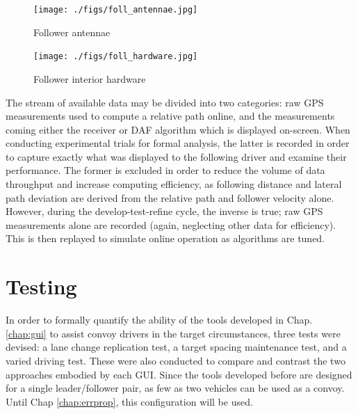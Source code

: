 \documentclass[12pt]{report}
\begin{document}
\begin{figure}[ht]
    \begin{minipage}[b]{0.45\linewidth} \centering \label{fig:antennaefoll}
        \texttt{[image: ./figs/foll\_antennae.jpg]} 
        \caption{Follower antennae}
    \end{minipage}
    \hspace{0.5cm}
    \begin{minipage}[b]{0.45\linewidth} \centering \label{fig:hardwarefoll}
        \texttt{[image: ./figs/foll\_hardware.jpg]}
        \caption{Follower interior hardware}
    \end{minipage}
\end{figure}


The stream of available data may be divided into two categories: raw GPS measurements used to compute a relative path online, and the measurements coming either the receiver or DAF algorithm which is displayed on-screen. When conducting experimental trials for formal analysis, the latter is recorded in order to capture exactly what was displayed to the following driver and examine their performance. The former is excluded in order to reduce the volume of data throughput and increase computing efficiency, as following distance and lateral path deviation are derived from the relative path and follower velocity alone. However, during the develop-test-refine cycle, the inverse is true; raw GPS measurements alone are recorded (again, neglecting other data for efficiency). This is then replayed to simulate online operation as algorithms are tuned.


\section{Testing} \label{sec:test}
In order to formally quantify the ability of the tools developed in Chap. \ref{chap:gui} to assist convoy drivers in the target circumstances, three tests were devised: a lane change replication test, a target spacing maintenance test, and a varied driving test. These were also conducted to compare and contrast the two approaches embodied by each GUI. Since the tools developed before are designed for a single leader/follower pair, as few as two vehicles can be used as a convoy. Until Chap \ref{chap:errprop}, this configuration will be used.

\end{document}
